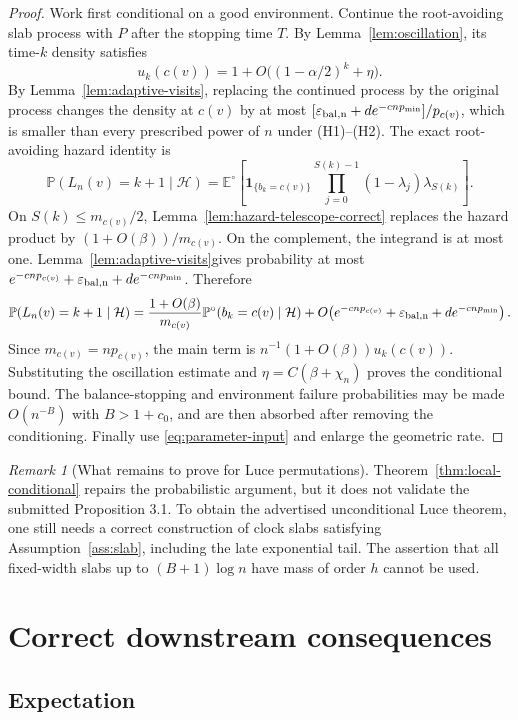 \documentclass[11pt]{article}
\newcommand{\E}{\mathbb E}
\newcommand{\Pp}{\mathbb P}
\newcommand{\1}{\mathbf 1}
\newcommand{\cH}{\mathcal H}
\theoremstyle{remark}
\newtheorem{remark}[theorem]{Remark}
\begin{document}
\begin{proof}
Work first conditional on a good environment.  Continue the root-avoiding
slab process with $P$ after the stopping time $T$.  By
Lemma~\ref{lem:oscillation}, its time-$k$ density satisfies
\[
 u_k(c(v))=1+O\bigl((1-\alpha/2)^k+\eta\bigr).
\]
By Lemma~\ref{lem:adaptive-visits}, replacing the continued process by the
original process changes the density at $c(v)$ by at most
$[\varepsilon_{\rm bal,n}+d e^{-cnp_{\min}}]/p_{c(v)}$, which is smaller than
every prescribed power of $n$ under (H1)--(H2).  The exact root-avoiding hazard identity is
\[
 \Pp(L_n(v)=k+1\mid\cH)
 =\E^\circ\left[
  \1_{\{b_k=c(v)\}}
  \prod_{j=0}^{S(k)-1}(1-\lambda_j)\lambda_{S(k)}
 \right].
\]
On $S(k)\le m_{c(v)}/2$, Lemma~\ref{lem:hazard-telescope-correct} replaces
the hazard product by $(1+O(\beta))/m_{c(v)}$.  On the complement, the integrand is at most one.  Lemma~\ref{lem:adaptive-visits}gives probability at most
$e^{-cnp_{c(v)}}+\varepsilon_{\rm bal,n}+d e^{-cnp_{\min}}$.  Therefore
\[
 \Pp(L_n(v)=k+1\mid\cH)
 =\frac{1+O(\beta)}{m_{c(v)}}
   \Pp^\circ(b_k=c(v)\mid\cH)
  +O\!\left(e^{-cnp_{c(v)}}+\varepsilon_{\rm bal,n}
                 +d e^{-cnp_{\min}}\right).
\]
Since $m_{c(v)}=np_{c(v)}$, the main term is
$n^{-1}(1+O(\beta))u_k(c(v))$.  Substituting the oscillation estimate and
$\eta=C(\beta+\chi_n)$ proves the conditional bound.  The balance-stopping and environment failure probabilities may be made
$O(n^{-B})$ with $B>1+c_0$, and are then absorbed after removing the
conditioning.  Finally use
\eqref{eq:parameter-input} and enlarge the geometric rate.
\end{proof}

\begin{remark}[What remains to prove for Luce permutations]
Theorem~\ref{thm:local-conditional} repairs the probabilistic argument, but it
does not validate the submitted Proposition 3.1.  To obtain the advertised
unconditional Luce theorem, one still needs a correct construction of clock
slabs satisfying Assumption~\ref{ass:slab}, including the late exponential
tail.  The assertion that all fixed-width slabs up to $(B+1)\log n$ have mass
of order $h$ cannot be used.
\end{remark}

\section{Correct downstream consequences}

\subsection{Expectation}
\end{document}
